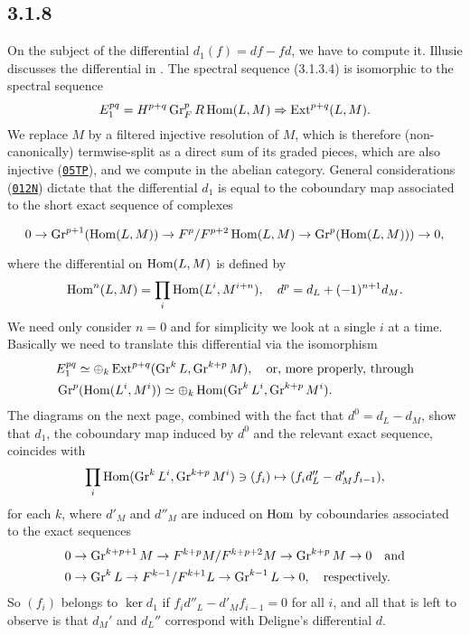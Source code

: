 \documentclass[deligne.tex]{subfiles}
\begin{document}
\subsection*{3.1.8}\label{BBD:3.1.8}
On the subject of the differential $d_1(f)=df-fd$,
we have to compute it. Illusie discusses the differential in
\cite[V 1.4.10]{Cotangent}.
The spectral sequence (3.1.3.4) is isomorphic to the spectral sequence
\begin{equation*}
	E_1^{pq}=H^{p+q}\operatorname{Gr}_F^pR\operatorname{Hom}(L,M)\Rightarrow\operatorname{Ext}^{p+q}(L,M).
\end{equation*}
We replace $M$ by a filtered injective resolution of $M$, which is 
therefore (non-canonically) termwise-split as a direct sum of its graded
pieces, which are also injective
(\href{https://stacks.math.columbia.edu/tag/05TP}{\texttt{05TP}}), and
we compute in the abelian category.
General considerations
(\href{https://stacks.math.columbia.edu/tag/012N}{\texttt{012N}}) dictate
that the differential $d_1$ is equal to the coboundary map
associated to the short exact sequence of complexes
\begin{ceqn}\begin{equation*}
	0\rightarrow\operatorname{Gr}^{p+1}(\operatorname{Hom}(L,M))\rightarrow F^p/F^{p+2} \operatorname{Hom}(L,M)
	\rightarrow\operatorname{Gr}^p(\operatorname{Hom}(L,M)))\rightarrow0,
\end{equation*}\end{ceqn}
where the differential on $\operatorname{Hom}(L,M)$ is defined by
\begin{equation*}
	\operatorname{Hom}^n(L,M)=\prod_i\operatorname{Hom}(L^i,M^{i+n}),\quad d^p=d_L+(-1)^{n+1}d_M.
\end{equation*}
We need only consider $n=0$ and for simplicity we look at a single $i$ at a
time. Basically we need to translate this differential via the isomorphism
\begin{align*}
	&E_1^{pq}\simeq\oplus_k\operatorname{Ext}^{p+q}(\operatorname{Gr}^kL,\operatorname{Gr}^{k+p}M),\quad\text{or, more properly, through} \\
	&\operatorname{Gr}^p(\operatorname{Hom}(L^i,M^i))\simeq\oplus_k\operatorname{Hom}(\operatorname{Gr}^kL^i,\operatorname{Gr}^{k+p}M^i).
\end{align*}
The diagrams on the next page, combined with the fact that $d^0=d_L-d_M$,
show that $d_1$, the coboundary map induced 
by $d^0$ and the relevant exact sequence, coincides with
\begin{equation*}
	\prod_i\operatorname{Hom}(\operatorname{Gr}^kL^i,\operatorname{Gr}^{k+p}M^i)\ni (f_i)\mapsto (f_id''_L-d'_Mf_{i-1}),
\end{equation*}
for each $k$, where $d'_M$ and $d''_M$ are induced on $\operatorname{Hom}$ by
coboundaries associated to the exact sequences
\begin{align*}
	&0\rightarrow\operatorname{Gr}^{k+p+1}M\rightarrow F^{k+p}M/F^{k+p+2}M\rightarrow\operatorname{Gr}^{k+p}M\rightarrow0\quad\text{and} \\
	&0\rightarrow\operatorname{Gr}^kL\rightarrow F^{k-1}/F^{k+1}L\rightarrow\operatorname{Gr}^{k-1}L\rightarrow0,\quad\text{respectively.}
\end{align*}
So $(f_i)$ belongs to $\ker d_1$ if $f_id''_L-d'_Mf_{i-1}=0$ for all $i$,
and all that is left to observe is that $d_M'$ and $d_L''$ correspond with
Deligne's differential $d$.
\end{document}
